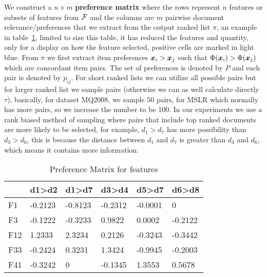 We construct a $n\times m$ \textbf{preference matrix} where the rows represent $n$ features or subsets of features from $\mathcal{F}$ and the columns are $m$ pairwise document relevance/preferences that we extract from the output ranked list $\pi$, an example in table~\ref{tab:Matrix}, limited to size this table, it has reduced the features and quantity, only for a display on how the feature selected, positive cells are marked in light blue. From $\pi$ we first extract item preferences $\boldsymbol{x}_i > \boldsymbol{x}_j$  such that $\Phi(\boldsymbol{x}_i) > \Phi(\boldsymbol{x}_j)$ which are concordant item pairs. The set of preferences is denoted by $P$ and each pair is denoted by $p_{ij}$. For short ranked lists we can utilize all possible pairs but for larger ranked list we sample pairs (otherwise we can as well calculate directly $\tau$), basically, for dataset MQ2008, we sample 50 pairs, for MSLR which normally has more pairs, so we increase the number to be 100. In our experiments we use a rank biased method of sampling where pairs that include top ranked documents are more likely to be selected, for example, $d_{1}>d_{7}$ has more possibility than $d_{3}>d_{6}$, this is because the distance between $d_{1}$ and $d_{7}$ is greater than $d_{3}$ and $d_{6}$, which means it contains more information.

\begin{table}[]
\begin{tabular}{|l|l|l|l|l|l|}
\hline
    & \rowcolor[gray]{0.8}d1>d2   & d1>d7   & d3>d4   & d5>d7   & d6>d8   \\ \hline
\cellcolor[gray]{0.8}F1  & -0.2123 & -0.8123 & -0.2312 & -0.0001 & 0       \\ \hline
\cellcolor[gray]{0.8}F3  & -0.1222 & -0.3233 &\cellcolor{intnull} 0.9822  &\cellcolor{intnull} 0.0002  & -0.2122 \\ \hline
\cellcolor[gray]{0.8}F12 &\cellcolor{intnull} 1.2333  &\cellcolor{intnull} 2.3234  &\cellcolor{intnull} 0.2126  & -0.3243 & -0.3442 \\ \hline
\cellcolor[gray]{0.8}F33 & -0.2424 & \cellcolor{intnull}0.3231  &\cellcolor{intnull} 1.3424  & -0.9945 & -0.2003 \\ \hline
\cellcolor[gray]{0.8}F41 & -0.3242 & 0       & -0.1345 &\cellcolor{intnull} 1.3553  & \cellcolor{intnull}0.5678  \\ \hline
\end{tabular}\caption{Preference Matrix for features}\label{tab:Matrix}
\end{table}



